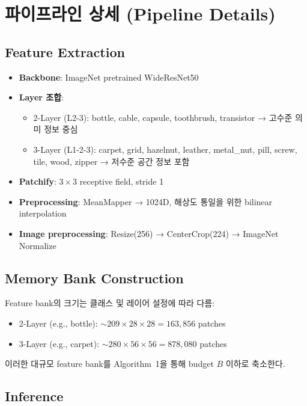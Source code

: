 \documentclass[11pt,a4paper]{article}
\begin{document}
\section{파이프라인 상세 (Pipeline Details)}

\subsection{Feature Extraction}

\begin{itemize}
  \item \textbf{Backbone}: ImageNet pretrained WideResNet50
  \item \textbf{Layer 조합}:
  \begin{itemize}
    \item 2-Layer (L2-3): bottle, cable, capsule, toothbrush, transistor → 고수준 의미 정보 중심
    \item 3-Layer (L1-2-3): carpet, grid, hazelnut, leather, metal\_nut, pill, screw, tile, wood, zipper → 저수준 공간 정보 포함
  \end{itemize}
  \item \textbf{Patchify}: $3 \times 3$ receptive field, stride 1
  \item \textbf{Preprocessing}: MeanMapper → 1024D, 해상도 통일을 위한 bilinear interpolation
  \item \textbf{Image preprocessing}: Resize(256) → CenterCrop(224) → ImageNet Normalize
\end{itemize}

\subsection{Memory Bank Construction}

Feature bank의 크기는 클래스 및 레이어 설정에 따라 다름:
\begin{itemize}
  \item 2-Layer (e.g., bottle): $\sim$$209 \times 28 \times 28 = 163{,}856$ patches
  \item 3-Layer (e.g., carpet): $\sim$$280 \times 56 \times 56 = 878{,}080$ patches
\end{itemize}

이러한 대규모 feature bank를 Algorithm~1을 통해 budget $B$ 이하로 축소한다.

\subsection{Inference}
\end{document}
